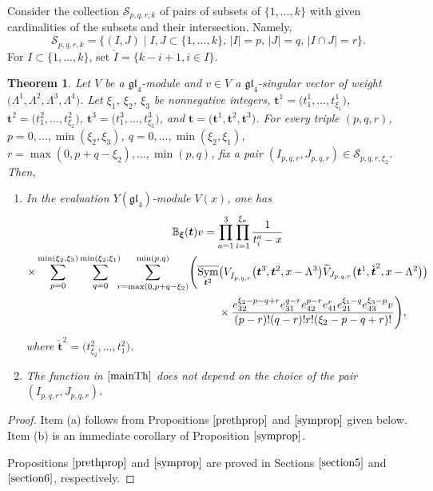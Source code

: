 \documentclass[pdftex]{sigma}
\numberwithin{equation}{section}
\newtheorem{Theorem}{Theorem}[section]
\DeclareMathOperator{\Symb}{\overline{Sym} }
\begin{document}
Consider the collection $\mathcal{S}_{p,q,r,k}$ of pairs of subsets of $\{1,\dots,k\}$ with given cardinalities of the subsets and their intersection. Namely,
\begin{equation*}
\mathcal{S}_{p,q,r,k}=\{(I,J) \mid I, J \subset\{1,\dots,k\}, \, |I|=p,\, |J|=q,\, |I\cap J| =r\}.
\end{equation*}
For $I\subset\{1,\dots,k\}$, set $\check{I}=\{k-i+1, i\in I\}$.
\begin{Theorem}\label{main}
Let $V$ be a $\mathfrak{gl}_4$-module and $v\in V$ a $\mathfrak{gl}_4$-singular vector of weight $\bigl(\Lambda^1,\Lambda^2,\Lambda^3,\Lambda^4\bigr)$. Let $\xi_1$, $\xi_2$, $\xi_3$ be nonnegative integers, $\boldsymbol{t}^1=\bigl(t^1_1,\dots,t^1_{\xi_1}\bigr)$, $\boldsymbol{t}^2=\bigl(t^2_1,\dots,t^2_{\xi_2}\bigr)$, $\boldsymbol{t}^3=\bigl(t^3_1,\dots,t^3_{\xi_3}\bigr)$, and $\boldsymbol{t}=\bigl(\boldsymbol{t}^1,\boldsymbol{t}^2,\boldsymbol{t}^3\bigr)$. For every triple $(p,q,r)$, $p=0,\dots,\min(\xi_2,\xi_3)$, $q=0,\dots,\min(\xi_2,\xi_1)$, $r=\max (0, p+q-\xi_2),\dots,\min(p,q)$, fix a pair $(I_{p,q,r},J_{p,q,r})\in \mathcal{S}_{p,q,r,\xi_2}$. Then,

\begin{enumerate}\itemsep=0pt
\item[$(a)$] In the evaluation $Y(\mathfrak{gl}_4)$-module $V(x)$, one has
\begin{gather}
 {\mathbb{B}}_{\boldsymbol{\xi}}(\boldsymbol{t}) v=\prod_{a=1}^{3}\prod_{i=1}^{\xi_a}\frac{1}{t^a_i-x}\nonumber\\
\times\sum\limits_{p=0}^{\min(\xi_2,\xi_3)}
\sum\limits_{q=0}^{\min(\xi_2,\xi_1)} \!\!\!\sum\limits_{r=\max (0, p+q-\xi_2)}^{\min(p,q)} \Biggl(\Symb_{\boldsymbol{t}^2 }\bigl( V_{\check{I}_{p,q,r}}\bigl(\boldsymbol{t}^3, \boldsymbol{t}^2,x-\Lambda^3\bigr) \widetilde{V}_{J_{p,q,r}}\bigl( \boldsymbol{t}^1, \check{\boldsymbol{t}}^2,x-\Lambda^2\bigr)\bigr) \nonumber\\
\hphantom{\sum\limits_{p=0}^{\min(\xi_2,\xi_3)}\sum\limits_{q=0}^{\min(\xi_2,\xi_1)} \sum\limits_{r=\max (0, p+q-\xi_2)}^{\min(p,q)} \Biggl(}{} \
\times \frac{e_{32}^{\xi_2-p-q+r} e_{31}^{q-r} e_{42}^{p-r} e_{41}^{r} e_{21}^{\xi_1-q} e_{43}^{\xi_3-p} v}{(p-r)!(q-r)! r!(\xi_2-p-q+r)!}\Biggr),\label{mainTh}
\end{gather}
where $\check{\boldsymbol{t}}^2=\bigl(t^2_{\xi_2},\dots,t^2_1\bigr)$.
\item[$(b)$] The function \smash{$\Symb_{\boldsymbol{t}^2 }\bigl(V_{\check{I}_{p,q,r}}\bigl(\boldsymbol{t}^{ 3}, \boldsymbol{t}^{ 2},x-\Lambda^3\bigr) \widetilde{V}_{J_{p,q,r}}\bigl(\boldsymbol{t}^{ 1}, \check{\boldsymbol{t}}^{ 2},x-\Lambda^2\bigr) \bigr)$} in $\eqref{mainTh}$ does not depend on the choice of the pair $(I_{p,q,r},J_{p,q,r})$.
\end{enumerate} \end{Theorem}
\begin{proof}
Item (a) follows from Propositions $\ref{prethprop}$ and $\ref{symprop}$ given below. Item (b) is an immediate corollary of Proposition $\ref{symprop}$.

Propositions $\ref{prethprop}$ and $\ref{symprop}$ are proved in Sections $\ref{section5}$ and $\ref{section6}$, respectively.
\end{proof}
\end{document}
